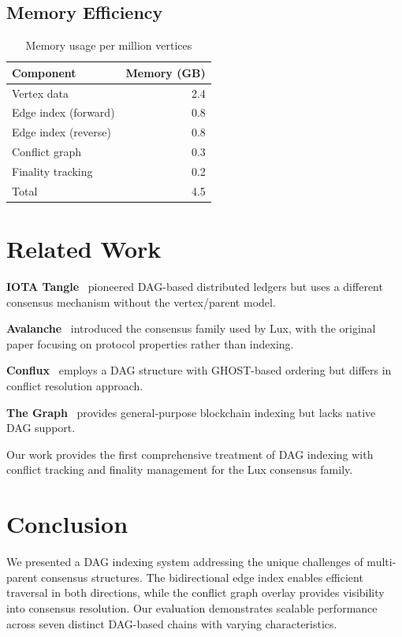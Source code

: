 \documentclass[11pt,twocolumn]{article}
\begin{document}
\subsection{Memory Efficiency}

\begin{table}[h]
\centering
\caption{Memory usage per million vertices}
\begin{tabular}{@{}lr@{}}
\toprule
Component & Memory (GB) \\
\midrule
Vertex data & 2.4 \\
Edge index (forward) & 0.8 \\
Edge index (reverse) & 0.8 \\
Conflict graph & 0.3 \\
Finality tracking & 0.2 \\
\midrule
Total & 4.5 \\
\bottomrule
\end{tabular}
\label{tab:memory}
\end{table}

\section{Related Work}

\textbf{IOTA Tangle}~\cite{iota} pioneered DAG-based distributed ledgers but uses a different consensus mechanism without the vertex/parent model.

\textbf{Avalanche}~\cite{avalanche} introduced the consensus family used by Lux, with the original paper focusing on protocol properties rather than indexing.

\textbf{Conflux}~\cite{conflux} employs a DAG structure with GHOST-based ordering but differs in conflict resolution approach.

\textbf{The Graph}~\cite{thegraph} provides general-purpose blockchain indexing but lacks native DAG support.

Our work provides the first comprehensive treatment of DAG indexing with conflict tracking and finality management for the Lux consensus family.

\section{Conclusion}

We presented a DAG indexing system addressing the unique challenges of multi-parent consensus structures. The bidirectional edge index enables efficient traversal in both directions, while the conflict graph overlay provides visibility into consensus resolution. Our evaluation demonstrates scalable performance across seven distinct DAG-based chains with varying characteristics.
\end{document}
